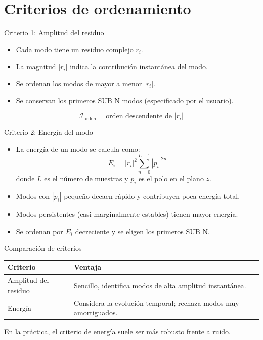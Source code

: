 \documentclass{beamer}
\begin{document}
\section{Criterios de ordenamiento}

\begin{frame}{Criterio 1: Amplitud del residuo}
\begin{itemize}
  \item Cada modo tiene un residuo complejo \(r_i\).
  \item La magnitud \(|r_i|\) indica la contribución instantánea del modo.
  \item Se ordenan los modos de mayor a menor \(|r_i|\).
  \item Se conservan los primeros \(\text{SUB\_N}\) modos (especificado por el usuario).
\end{itemize}
\[
\mathcal{I}_{\text{orden}} = \text{orden descendente de } |r_i|
\]
\end{frame}

\begin{frame}{Criterio 2: Energía del modo}
\begin{itemize}
  \item La energía de un modo se calcula como:
  \[
  E_i = |r_i|^2 \sum_{n=0}^{L-1} |p_i|^{2n}
  \]
  donde \(L\) es el número de muestras y \(p_i\) es el polo en el plano \(z\).
  \item Modos con \(|p_i|\) pequeño decaen rápido y contribuyen poca energía total.
  \item Modos persistentes (casi marginalmente estables) tienen mayor energía.
  \item Se ordenan por \(E_i\) decreciente y se eligen los primeros \(\text{SUB\_N}\).
\end{itemize}
\end{frame}

\begin{frame}{Comparación de criterios}
\begin{center}
\begin{tabular}{|l|p{5cm}|}
\hline
\textbf{Criterio} & \textbf{Ventaja} \\
\hline
Amplitud del residuo & Sencillo, identifica modos de alta amplitud instantánea. \\
\hline
Energía & Considera la evolución temporal; rechaza modos muy amortiguados. \\
\hline
\end{tabular}
\end{center}
\vspace{0.5cm}
En la práctica, el criterio de energía suele ser más robusto frente a ruido.
\end{frame}
\end{document}
